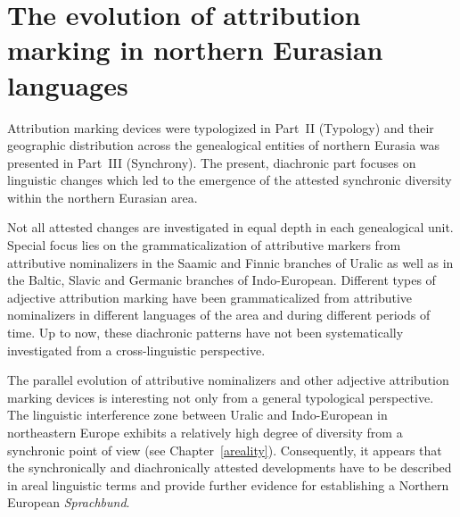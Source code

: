 
\chapter[The evolution of attribution marking]{The evolution of attribution marking in northern Eurasian languages}
Attribution marking devices were typologized in Part~II (Typology) and their geographic distribution across the genealogical entities of northern Eurasia was presented in Part~III (Synchrony). The present, diachronic part focuses on linguistic changes which led to the emergence of the attested synchronic diversity within the northern Eurasian area.

\largerpage[-1]
Not all attested changes are investigated in equal depth in each genealogical unit. Special focus lies on the grammaticalization of attributive markers from attributive nominalizers in the Saamic  and Finnic branches of Uralic as well as in the Baltic, Slavic and Germanic branches of Indo-European. Different types of adjective attribution marking have been grammaticalized from attributive nominalizers in different languages of the area and during different periods of time. Up to now, these diachronic patterns have not been systematically investigated from a cross-linguistic perspective.

The parallel evolution of attributive nominalizers and other adjective attribution marking devices is interesting not only from a general typological perspective. The linguistic interference zone between Uralic and Indo-European in northeastern Europe exhibits a relatively high degree of diversity from a synchronic point of view (see Chapter~\ref{areality}). Consequently, it appears that the synchronically and diachronically attested developments have to be described in areal linguistic terms and provide further evidence for establishing a Northern European \textit{Sprachbund}.


